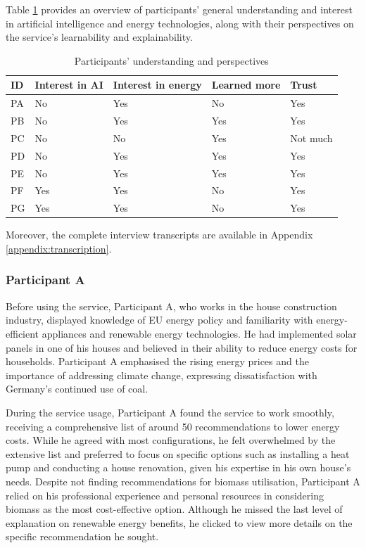 Table \ref{tab:participants_perceptions} provides an overview of participants' general understanding and interest in artificial intelligence and energy technologies, 
along with their perspectives on the service's learnability and explainability. 
\begin{table}[h!]
  \centering
  \begin{tabular}{ | p{} | p{} | p{} | p{} | p{} | } 
    \hline
    ID & Interest in AI & Interest in energy & Learned more & Trust \\
    \hline
    PA & No & Yes & No & Yes \\
    \hline
    PB & No & Yes & Yes & Yes \\
    \hline
    PC & No & No & Yes & Not much \\
    \hline
    PD & No & Yes & Yes & Yes \\
    \hline
    PE & No & Yes & Yes & Yes \\
    \hline
    PF & Yes & Yes & No & Yes \\
    \hline
    PG & Yes & Yes & No & Yes \\
    \hline
  \end{tabular}
  \caption{Participants' understanding and perspectives}
  \label{tab:participants_perceptions}
\end{table}

Moreover, the complete interview transcripts are available in Appendix \ref{appendix:transcription}.


\subsubsection{Participant A}

Before using the service, 
Participant A, who works in the house construction industry, 
displayed knowledge of EU energy policy and familiarity with energy-efficient appliances and renewable energy technologies. 
He had implemented solar panels in one of his houses and believed in their ability to reduce energy costs for households. 
Participant A emphasised the rising energy prices and the importance of addressing climate change, expressing dissatisfaction with Germany's continued use of coal. 

During the service usage, 
Participant A found the service to work smoothly, receiving a comprehensive list of around 50 recommendations to lower energy costs. 
While he agreed with most configurations, he felt overwhelmed by the extensive list and preferred to focus on specific options such as installing a heat pump and conducting a house renovation, given his expertise in his own house's needs. 
Despite not finding recommendations for biomass utilisation, Participant A relied on his professional experience and personal resources in considering biomass as the most cost-effective option. 
Although he missed the last level of explanation on renewable energy benefits, he clicked to view more details on the specific recommendation he sought.

